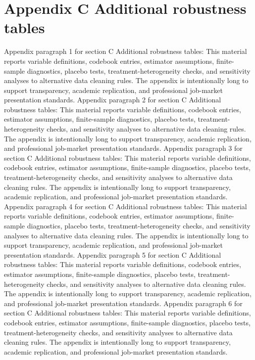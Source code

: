 \documentclass[preprint,12pt]{elsarticle}
\begin{document}
\section{Appendix C Additional robustness tables}
Appendix paragraph 1 for section C Additional robustness tables: This material reports variable definitions, codebook entries, estimator assumptions, finite-sample diagnostics, placebo tests, treatment-heterogeneity checks, and sensitivity analyses to alternative data cleaning rules. The appendix is intentionally long to support transparency, academic replication, and professional job-market presentation standards.
Appendix paragraph 2 for section C Additional robustness tables: This material reports variable definitions, codebook entries, estimator assumptions, finite-sample diagnostics, placebo tests, treatment-heterogeneity checks, and sensitivity analyses to alternative data cleaning rules. The appendix is intentionally long to support transparency, academic replication, and professional job-market presentation standards.
Appendix paragraph 3 for section C Additional robustness tables: This material reports variable definitions, codebook entries, estimator assumptions, finite-sample diagnostics, placebo tests, treatment-heterogeneity checks, and sensitivity analyses to alternative data cleaning rules. The appendix is intentionally long to support transparency, academic replication, and professional job-market presentation standards.
Appendix paragraph 4 for section C Additional robustness tables: This material reports variable definitions, codebook entries, estimator assumptions, finite-sample diagnostics, placebo tests, treatment-heterogeneity checks, and sensitivity analyses to alternative data cleaning rules. The appendix is intentionally long to support transparency, academic replication, and professional job-market presentation standards.
Appendix paragraph 5 for section C Additional robustness tables: This material reports variable definitions, codebook entries, estimator assumptions, finite-sample diagnostics, placebo tests, treatment-heterogeneity checks, and sensitivity analyses to alternative data cleaning rules. The appendix is intentionally long to support transparency, academic replication, and professional job-market presentation standards.
Appendix paragraph 6 for section C Additional robustness tables: This material reports variable definitions, codebook entries, estimator assumptions, finite-sample diagnostics, placebo tests, treatment-heterogeneity checks, and sensitivity analyses to alternative data cleaning rules. The appendix is intentionally long to support transparency, academic replication, and professional job-market presentation standards.
\end{document}
